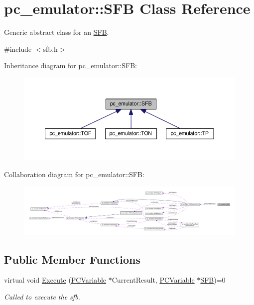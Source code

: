 \hypertarget{classpc__emulator_1_1SFB}{}\section{pc\+\_\+emulator\+:\+:S\+FB Class Reference}
\label{classpc__emulator_1_1SFB}


Generic abstract class for an \hyperlink{classpc__emulator_1_1SFB}{S\+FB}.  




{\ttfamily \#include $<$sfb.\+h$>$}



Inheritance diagram for pc\+\_\+emulator\+:\+:S\+FB\+:
\nopagebreak
\begin{figure}[H]
\begin{center}
\leavevmode
\includegraphics[width=350pt]{classpc__emulator_1_1SFB__inherit__graph}
\end{center}
\end{figure}


Collaboration diagram for pc\+\_\+emulator\+:\+:S\+FB\+:
\nopagebreak
\begin{figure}[H]
\begin{center}
\leavevmode
\includegraphics[width=350pt]{classpc__emulator_1_1SFB__coll__graph}
\end{center}
\end{figure}
\subsection*{Public Member Functions}
\begin{DoxyCompactItemize}
\item 
virtual void \hyperlink{classpc__emulator_1_1SFB_a203227dee0fcab88b8e9d1055c29d958}{Execute} (\hyperlink{classpc__emulator_1_1PCVariable}{P\+C\+Variable} $\ast$Current\+Result, \hyperlink{classpc__emulator_1_1PCVariable}{P\+C\+Variable} $\ast$\hyperlink{classpc__emulator_1_1SFB}{S\+FB})=0
\begin{DoxyCompactList}\small\item\em Called to execute the sfb. \end{DoxyCompactList}\end{DoxyCompactItemize}
